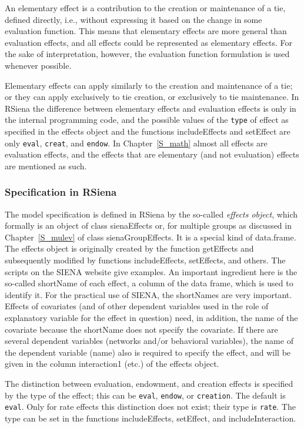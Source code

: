 \documentclass[a4paper,fleqn,11pt]{article}
\newcommand{\+}{\, + \,}
\newcommand{\sfn}[1]{\textsf{#1}}
\newcommand{\RS}{{\sf \textsf{RSiena} }}
\newcommand{\SI}{{\sf SIENA }}
\newcommand{\si}{{\sf SIENA}}
\begin{document}
An elementary effect is a contribution to the creation or maintenance of a tie,
defined directly, i.e., without expressing it based on the
change in some evaluation function.
This means that elementary effects are more general than
evaluation effects, and all effects could be represented as elementary effects.
For the sake of interpretation, however, the evaluation function formulation
is used whenever possible.

Elementary effects can apply similarly to the creation and maintenance of a tie;
or they can apply exclusively to tie creation, or exclusively to tie
maintenance. In \RS the difference between elementary effects and evaluation effects
is only in the internal programming code, and the
possible values of the \texttt{type} of effect
as specified in the effects object and the
functions \sfn{includeEffects} and \sfn{setEffect}
are only \texttt{eval}, \texttt{creat}, and \texttt{endow}.
In Chapter~\ref{S_math} almost all effects are evaluation effects,
and the effects that are elementary (and not evaluation) effects
are mentioned as such.

\subsubsection{Specification in \RS}

The model specification is defined in \RS by the so-called
\emph{effects object}, which formally is an object of class
\sfn{sienaEffects} or, for multiple groups as discussed in Chapter~\ref{S_mulev}
of class \sfn{sienaGroupEffects}.
It is a special kind of \sfn{data.frame}.
The effects object is originally created by the function \textsf{getEffects} and
subsequently modified by functions \sfn{includeEffects},
\sfn{setEffects}, and others.
The scripts on the \SI website give examples.
An important ingredient here is the so-called \sfn{shortName}
of each effect, a column of the data frame, which is used to identify it.
For the practical use of \si, the \sfn{shortName}s are very important.
Effects of covariates (and of other dependent variables used in
the role of explanatory variable for the effect in question)
need, in addition, the name of the covariate
because the \sfn{shortName} does not specify the covariate.
If there are several dependent variables (networks and/or behavioral variables),
the name of the dependent variable (\sfn{name}) also is required
to specify the effect, and will be given in the column \sfn{interaction1}
(etc.) of the effects object.

The distinction between evaluation, endowment, and creation effects is
specified by the \sfn{type} of the effect; this can be
\texttt{eval}, \texttt{endow}, or \texttt{creation}.
The default is \texttt{eval}.
Only for rate effects this distinction does not exist;
their \sfn{type} is \texttt{rate}.
The \sfn{type} can be set in the functions \sfn{includeEffects},
\textsf{setEffect}, and \sfn{includeInteraction}.
\end{document}
